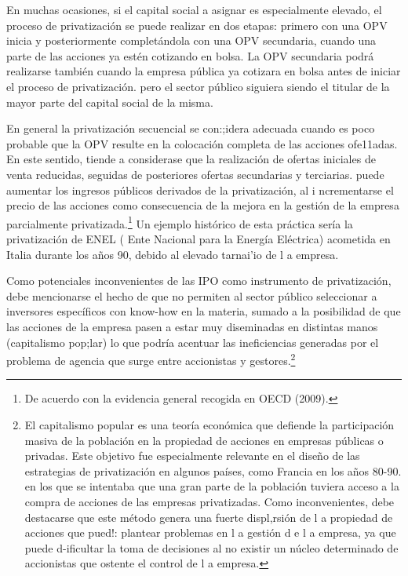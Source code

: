 \documentclass[10pt,a4paper]{article}
\begin{document}
En muchas ocasiones, si el capital social a asignar es especialmente elevado, el proceso de privatización se puede realizar en dos etapas: primero con una OPV inicia y posteriormente completándola con una OPV secundaria, cuando una parte de las acciones ya estén cotizando en bolsa. La OPV secundaria podrá realizarse también cuando la empresa pública ya cotizara en bolsa antes de iniciar el proceso de privatización. pero el sector público siguiera siendo el titular de la mayor parte del capital social de la misma.

En general la privatización secuencial se con:;idera adecuada cuando es poco probable que la OPV resulte en la colocación completa de las acciones ofe11adas. En este sentido, tiende a considerase que la realización de ofertas iniciales de venta reducidas, seguidas de posteriores ofertas secundarias y terciarias. puede aumentar los ingresos públicos derivados de la privatización, al i ncrementarse el precio de las acciones como consecuencia de la mejora en la gestión de la empresa parcialmente privatizada.\footnote{De acuerdo con la evidencia general recogida en OECD (2009).
} Un ejemplo histórico de esta práctica sería la privatización de ENEL ( Ente Nacional para la Energía Eléctrica) acometida en Italia durante los años 90, debido al elevado tarnai'io de l a empresa.

Como potenciales inconvenientes de las IPO como instrumento de privatización, debe mencionarse el hecho de que no permiten al sector público seleccionar a inversores específicos con know-how en la materia, sumado a la posibilidad de que las acciones de la empresa pasen a estar muy diseminadas en distintas manos (capitalismo pop;lar) lo que podría acentuar las ineficiencias generadas por el problema de agencia que surge entre accionistas y gestores.\footnote{%
    El capitalismo popular es una teoría económica que defiende la participación masiva de la población en la propiedad de acciones en empresas públicas o privadas. Este objetivo fue especialmente relevante en el diseño de las estrategias de privatización en algunos países, como Francia en los años 80-90. en los que se intentaba que una gran parte de la población tuviera acceso a la compra de acciones de las empresas privatizadas. Como inconvenientes, debe destacarse que este método genera una fuerte displ,rsión de l a propiedad de acciones que pued!: plantear problemas en l a gestión d e l a empresa, ya que puede d-ificultar la toma de decisiones al no existir un núcleo determinado de accionistas que ostente el control de l a empresa.
}
\end{document}
